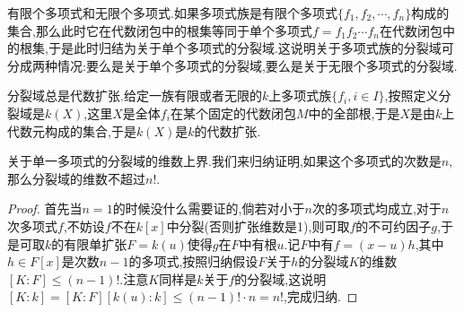 有限个多项式和无限个多项式.如果多项式族是有限个多项式$\{f_1,f_2,\cdots,f_n\}$构成的集合,那么此时它在代数闭包中的根集等同于单个多项式$f=f_1f_2\cdots f_n$在代数闭包中的根集,于是此时归结为关于单个多项式的分裂域.这说明关于多项式族的分裂域可分成两种情况:要么是关于单个多项式的分裂域,要么是关于无限个多项式的分裂域.

分裂域总是代数扩张.给定一族有限或者无限的$k$上多项式族$\{f_i,i\in I\}$,按照定义分裂域是$k(X)$,这里$X$是全体$f_i$在某个固定的代数闭包$M$中的全部根,于是$X$是由$k$上代数元构成的集合,于是$k(X)$是$k$的代数扩张.

关于单一多项式的分裂域的维数上界.我们来归纳证明,如果这个多项式的次数是$n$,那么分裂域的维数不超过$n!$.
\begin{proof}

首先当$n=1$的时候没什么需要证的,倘若对小于$n$次的多项式均成立,对于$n$次多项式$f$,不妨设$f$不在$k[x]$中分裂(否则扩张维数是1),则可取$f$的不可约因子$g$,于是可取$k$的有限单扩张$F=k(u)$使得$g$在$F$中有根$u$.记$F$中有$f=(x-u)h$,其中$h\in F[x]$是次数$n-1$的多项式,按照归纳假设$F$关于$h$的分裂域$K$的维数$[K:F]\le(n-1)!$.注意$K$同样是$k$关于$f$的分裂域,这说明$[K:k]=[K:F][k(u):k]\le(n-1)!\cdot n=n!$,完成归纳.
\end{proof}


